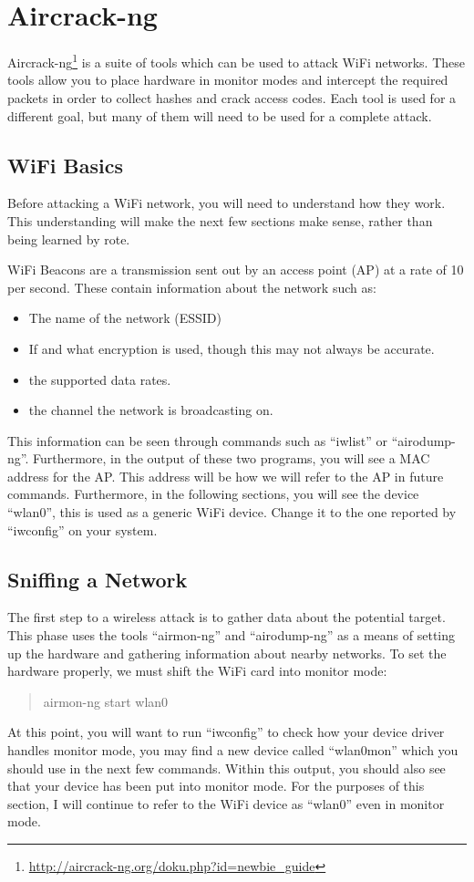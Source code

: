 \documentclass[a4paper,11pt]{report}
\begin{document}
	\section{Aircrack-ng}
		Aircrack-ng\footnote{\url{http://aircrack-ng.org/doku.php?id=newbie\_guide}} is a suite of tools which can be used to attack WiFi networks. 
		These tools allow you to place hardware in monitor modes and intercept the required packets in order to collect hashes and crack access codes. 
		Each tool is used for a different goal, but many of them will need to be used for a complete attack. 
		\subsection{WiFi Basics}
			Before attacking a WiFi network, you will need to understand how they work. 
			This understanding will make the next few sections make sense, rather than being learned by rote.

			WiFi Beacons are a transmission sent out by an access point (AP) at a rate of 10 per second. 
			These contain information about the network such as:
			\begin{itemize}
				\item The name of the network (ESSID)
				\item If and what encryption is used, though this may not always be accurate. 
				\item the supported data rates. 
				\item the channel the network is broadcasting on. 
			\end{itemize}
			This information can be seen through commands such as ``iwlist'' or ``airodump-ng''.
			Furthermore, in the output of these two programs, you will see a MAC address for the AP. 
			This address will be how we will refer to the AP in future commands. 
			Furthermore, in the following sections, you will see the device ``wlan0'', this is used as a generic WiFi device. 
			Change it to the one reported by ``iwconfig'' on your system. 
		\subsection{Sniffing a Network}
			The first step to a wireless attack is to gather data about the potential target. 
			This phase uses the tools ``airmon-ng'' and ``airodump-ng'' as a means of setting up the hardware and gathering information about nearby networks. 
			To set the hardware properly, we must shift the WiFi card into monitor mode:
			\begin{quote}
				airmon-ng start wlan0
			\end{quote}
			At this point, you will want to run ``iwconfig'' to check how your device driver handles monitor mode, you may find a new device called ``wlan0mon'' which you should use in the next few commands. 
			Within this output, you should also see that your device has been put into monitor mode. 
			For the purposes of this section, I will continue to refer to the WiFi device as ``wlan0'' even in monitor mode. 
\end{document}
